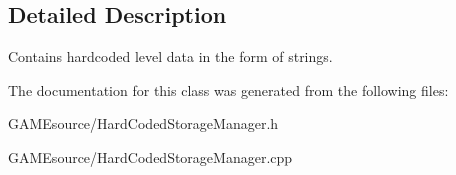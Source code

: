 \subsection{Detailed Description}
Contains hardcoded level data in the form of strings. 

The documentation for this class was generated from the following files\+:\begin{DoxyCompactItemize}
\item 
G\+A\+M\+Esource/Hard\+Coded\+Storage\+Manager.\+h\item 
G\+A\+M\+Esource/Hard\+Coded\+Storage\+Manager.\+cpp\end{DoxyCompactItemize}
